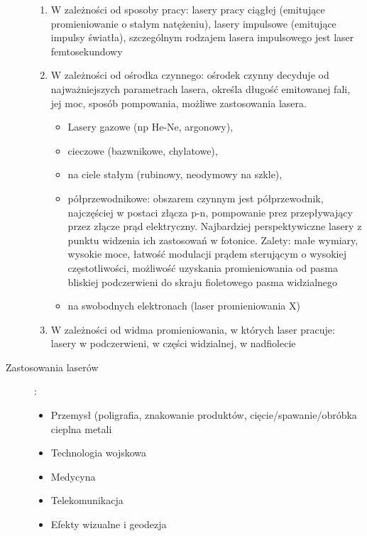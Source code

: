 \documentclass[a4paper,11pt]{article}
\begin{document}
\begin{description}
\begin{enumerate}
  \item W zależności od sposoby pracy: lasery pracy ciągłej (emitujące promieniowanie o stałym natężeniu), lasery impulsowe (emitujące impulsy światła), szczególnym rodzajem lasera impulsowego jest laser femtosekundowy
  \item W zależności od ośrodka czynnego: ośrodek czynny decyduje od najważniejszych parametrach lasera, określa długość emitowanej fali, jej moc, sposób pompowania, możliwe zastosowania lasera.
    \begin{itemize}
    \item Lasery gazowe (np He-Ne, argonowy), 
    \item cieczowe (bazwnikowe, chylatowe), 
    \item na ciele stałym (rubinowy, neodymowy na szkle), 
    \item półprzewodnikowe: obszarem czynnym jest półprzewodnik, najczęściej w postaci złącza p-n, pompowanie prez przepływający przez złącze prąd elektryczny. Najbardziej perspektywiczne lasery z punktu widzenia ich zastosowań w fotonice. Zalety: małe wymiary, wysokie moce, łatwość modulacji prądem sterującym o wysokiej częstotliwości, możliwość uzyskania promieniowania od pasma bliskiej podczerwieni do skraju fioletowego pasma widzialnego
    \item na swobodnych elektronach (laser promieniowania X)
    \end{itemize}
  \item W zależności od widma promieniowania, w których laser pracuje: lasery w podczerwieni, w części widzialnej, w nadfiolecie
  \end{enumerate}
\item[Zastosowania laserów]:
  \begin{itemize}
  \item Przemysł (poligrafia, znakowanie produktów, cięcie/spawanie/obróbka cieplna metali
  \item Technologia wojskowa
  \item Medycyna
  \item Telekomunikacja
  \item Efekty wizualne i geodezja
  \end{itemize}
\end{description}
\end{document}
